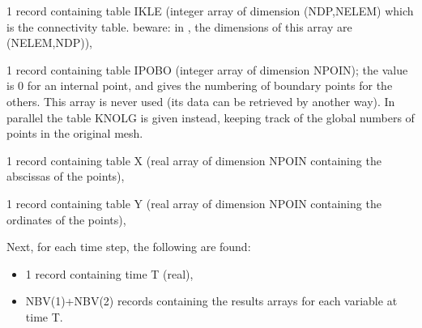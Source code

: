 1 record containing table IKLE (integer array of dimension (NDP,NELEM) which is
the connectivity table. beware: in , the dimensions of this array
are (NELEM,NDP)),

1 record containing table IPOBO (integer array of dimension NPOIN); the value
is 0 for an internal point, and gives the numbering of boundary points for the
others. This array is never used (its data can be retrieved by another way). In
parallel the table KNOLG is given instead, keeping track of the global numbers
of points in the original mesh.

1 record containing table X (real array of dimension NPOIN containing the
abscissas of the points),

1 record containing table Y (real array of dimension NPOIN containing the
ordinates of the points),

Next, for each time step, the following are found:
\begin{itemize}
  \item 1 record containing time T (real),
  \item NBV(1)+NBV(2) records containing the results arrays for each variable
    at time T.
\end{itemize}

